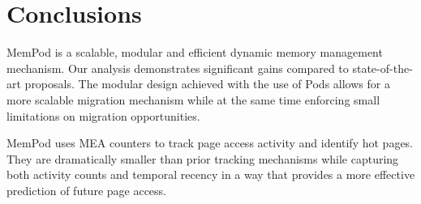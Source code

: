\section{Conclusions}
\label{sec:Conclusions}

MemPod is a scalable, modular and efficient dynamic memory management mechanism. Our analysis demonstrates significant gains compared to state-of-the-art proposals. The modular design achieved with the use of Pods allows for a more scalable migration mechanism while at the same time enforcing small limitations on migration opportunities.

MemPod uses MEA counters to track page access activity and identify hot
pages.  They are dramatically smaller than prior tracking mechanisms
while capturing both activity counts and temporal recency in a way that
provides a more effective prediction of future page access.



